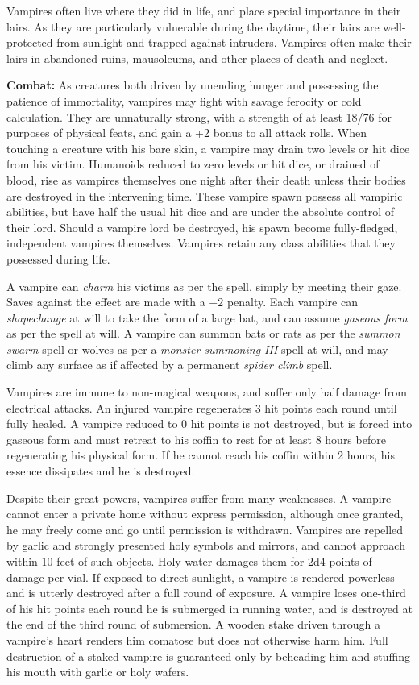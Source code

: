 \begin{multicols}{2}
Vampires often live where they did in life, and place special importance in their lairs. As they are particularly vulnerable during the daytime, their lairs are well-protected from sunlight and trapped against intruders. Vampires often make their lairs in abandoned ruins, mausoleums, and other places of death and neglect.

\textbf{Combat:} As creatures both driven by unending hunger and possessing the patience of immortality, vampires may fight with savage ferocity or cold calculation. They are unnaturally strong, with a strength of at least 18/76 for purposes of physical feats, and gain a +2 bonus to all attack rolls. When touching a creature with his bare skin, a vampire may drain two levels or hit dice from his victim. Humanoids reduced to zero levels or hit dice, or drained of blood, rise as vampires themselves one night after their death unless their bodies are destroyed in the intervening time. These vampire spawn possess all vampiric abilities, but have half the usual hit dice and are under the absolute control of their lord. Should a vampire lord be destroyed, his spawn become fully-fledged, independent vampires themselves. Vampires retain any class abilities that they possessed during life.

A vampire can \textit{charm} his victims as per the spell, simply by meeting their gaze. Saves against the effect are made with a $-2$ penalty. Each vampire can \textit{shapechange} at will to take the form of a large bat, and can assume \textit{gaseous form} as per the spell at will. A vampire can summon bats or rats as per the \textit{summon swarm} spell or wolves as per a \textit{monster summoning III} spell at will, and may climb any surface as if affected by a permanent \textit{spider climb} spell.

Vampires are immune to non-magical weapons, and suffer only half damage from electrical attacks. An injured vampire regenerates 3 hit points each round until fully healed. A vampire reduced to 0 hit points is not destroyed, but is forced into gaseous form and must retreat to his coffin to rest for at least 8 hours before regenerating his physical form. If he cannot reach his coffin within 2 hours, his essence dissipates and he is destroyed.

Despite their great powers, vampires suffer from many weaknesses. A vampire cannot enter a private home without express permission, although once granted, he may freely come and go until permission is withdrawn. Vampires are repelled by garlic and strongly presented holy symbols and mirrors, and cannot approach within 10 feet of such objects. Holy water damages them for 2d4 points of damage per vial. If exposed to direct sunlight, a vampire is rendered powerless and is utterly destroyed after a full round of exposure. A vampire loses one-third of his hit points each round he is submerged in running water, and is destroyed at the end of the third round of submersion. A wooden stake driven through a vampire's heart renders him comatose but does not otherwise harm him. Full destruction of a staked vampire is guaranteed only by beheading him and stuffing his mouth with garlic or holy wafers.


\end{multicols}

